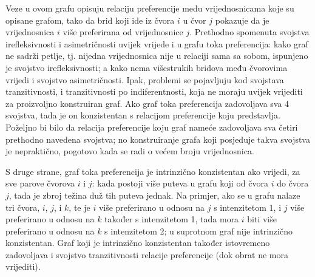 \documentclass[lmodern, utf8, diplomski, numeric]{fer}
\begin{document}
  Veze u ovom grafu opisuju relaciju preferencije među vrijednosnicama koje su opisane grafom, tako da brid koji ide iz čvora $i$ u čvor $j$ pokazuje da je vrijednosnica $i$ više preferirana od vrijednosnice $j$.
  Prethodno spomenuta svojstva irefleksivnosti i asimetričnosti uvijek vrijede i u grafu toka preferencija:
  kako graf ne sadrži petlje, tj. nijedna vrijednosnica nije u relaciji sama sa sobom, ispunjeno je svojstvo irefleksivnosti; a kako nema višestrukih bridova među čvorovima vrijedi i svojstvo asimetričnosti.
  Ipak, problemi se pojavljuju kod svojstava tranzitivnosti, i tranzitivnosti po indiferentnosti, koja ne moraju uvijek vrijediti za proizvoljno konstruiran graf.
  Ako graf toka preferencija zadovoljava sva 4 svojstva, tada je on konzistentan s relacijom preferencije koju predstavlja.
  Poželjno bi bilo da relacija preferencije koju graf nameće zadovoljava sva četiri prethodno navedena svojstva; no konstruiranje grafa koji posjeduje takva svojstva je nepraktično, pogotovo kada se radi o većem broju vrijednosnica.
  
  S druge strane, graf toka preferencija je intrinzično konzistentan ako vrijedi, za sve parove čvorova $i$ i $j$: kada postoji više puteva u grafu koji od čvora $i$ do čvora $j$, tada je zbroj težina duž tih puteva jednak.
  Na primjer, ako se u grafu nalaze tri čvora, $i$, $j$, i $k$, te je $i$ više preferirano u odnosu na $j$ s intenzitetom 1, i $j$ više preferirano u odnosu na $k$ također s intenzitetom 1, tada mora $i$ biti više preferirano u odnosu na $k$ s intenzitetom 2; u suprotnom graf nije intrinzično konzistentan.
  Graf koji je intrinzično konzistentan također istovremeno zadovoljava i svojstvo tranzitivnosti relacije preferencije (dok obrat ne mora vrijediti).
  
\end{document}
